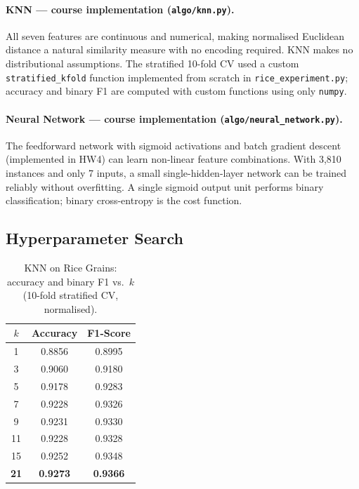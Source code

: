 \documentclass[11pt,letterpaper]{article}
\begin{document}
\paragraph{KNN --- course implementation (\texttt{algo/knn.py}).}
All seven features are continuous and numerical, making normalised Euclidean
distance a natural similarity measure with no encoding required.  KNN makes
no distributional assumptions.  The stratified 10-fold CV
used a custom \texttt{stratified\_kfold} function implemented from scratch
in \texttt{rice\_experiment.py}; accuracy and binary F1 are computed with
custom functions using only \texttt{numpy}.

\paragraph{Neural Network --- course implementation (\texttt{algo/neural\_network.py}).}
The feedforward network with sigmoid activations and batch gradient descent
(implemented in HW4) can learn non-linear feature combinations.  With 3,810
instances and only 7 inputs, a small single-hidden-layer network can be
trained reliably without overfitting.  A single sigmoid output unit performs
binary classification; binary cross-entropy is the cost function.

\subsection{Hyperparameter Search}

\begin{table}[ht]
\centering
\caption{KNN on Rice Grains: accuracy and binary F1 vs.\ $k$
         (10-fold stratified CV, normalised).}
\label{tab:d3_knn}
\begin{tabular}{@{}ccc@{}}
\toprule
$k$ & Accuracy & F1-Score \\
\midrule
1  & 0.8856 & 0.8995 \\
3  & 0.9060 & 0.9180 \\
5  & 0.9178 & 0.9283 \\
7  & 0.9228 & 0.9326 \\
9  & 0.9231 & 0.9330 \\
11 & 0.9228 & 0.9328 \\
15 & 0.9252 & 0.9348 \\
\rowcolor{hilight}
\textbf{21} & \textbf{0.9273} & \textbf{0.9366} \\
\bottomrule
\end{tabular}
\end{table}
\end{document}
